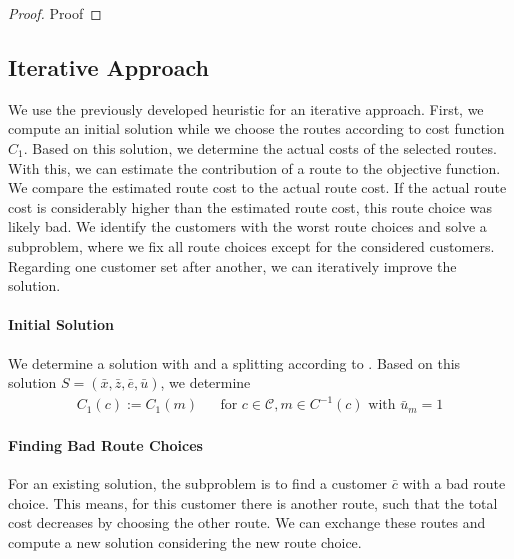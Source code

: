 \begin{proof}

Proof

\end{proof}


\subsection{Iterative Approach}
\label{sec:iterative_approach}

We use the previously developed heuristic for an iterative approach. First, we compute an initial solution while we choose the routes according to cost function $C_1$. Based on this solution, we determine the actual costs of the selected routes. With this, we can estimate the contribution of a route to the objective function. We compare the estimated route cost to the actual route cost. If the actual route cost is considerably higher than the estimated route cost, this route choice was likely bad. We identify the customers with the worst route choices and solve a subproblem, where we fix all route choices except for the considered customers. Regarding one customer set after another, we can iteratively improve the solution.

\paragraph{Initial Solution} \parfill

We determine a solution with  and a splitting according to . Based on this solution $S=\left(\bar{x},\bar{z},\bar{e},\bar{u}\right)$, we determine 
\begin{align*}
	C_1(c) := C_1(m) && \text{for } c\in\mathcal{C}, m\in C^{-1}(c) \text{ with } \bar{u}_m = 1
\end{align*}

\paragraph{Finding Bad Route Choices} \parfill

For an existing solution, the subproblem is to find a customer $\bar{c}$ with a bad route choice. This means, for this customer there is another route, such that the total cost decreases by choosing the other route. We can exchange these routes and compute a new solution considering the new route choice. 

